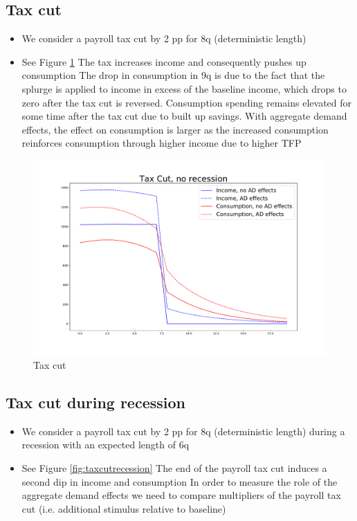 \documentclass[]{article}
\begin{document}
\FloatBarrier
\subsection{Tax cut}

\begin{itemize}
	\item We consider a payroll tax cut by 2 pp for 8q (deterministic length)
	\item See Figure \ref{fig:taxcut}
	\subitem The tax increases income and consequently pushes up consumption
	\subitem The drop in consumption in 9q is due to the fact that the splurge is applied to income in excess of the baseline income, which drops to zero after the tax cut is reversed. Consumption spending remains elevated for some time after the tax cut due to built up savings. 
	\subitem With aggregate demand effects, the effect on consumption is larger as the increased consumption reinforces consumption through higher income due to higher TFP	
\end{itemize}

\begin{figure} 
	\begin{centering}
		\includegraphics[width=\linewidth]{../tax_cut.pdf}
		\caption{Tax cut}
		\label{fig:taxcut}
	\end{centering}
\end{figure}

\FloatBarrier
\subsection{Tax cut during recession}

\begin{itemize}
	\item We consider a payroll tax cut by 2 pp for 8q (deterministic length) during a recession with an expected length of 6q
	\item See Figure \ref{fig:taxcutrecession}
	\subitem The end of the payroll tax cut induces a second dip in income and consumption
	\subitem In order to measure the role of the aggregate demand effects we need to compare multipliers of the payroll tax cut (i.e. additional stimulus relative to baseline)
\end{itemize}
\end{document}
